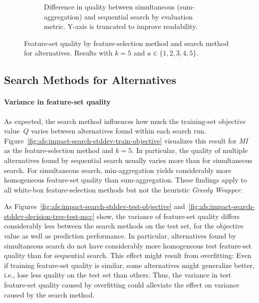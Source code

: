 \documentclass{article}
\theoremstyle{definition}
\begin{document}
\begin{figure}[t]
\begin{subfigure}[t]{0.48\textwidth}
		\caption{
			Difference in quality between simultaneous (sum-aggregation) and sequential search by evaluation metric.
			Y-axis is truncated to improve readability.
		}
		\label{fig:afs:impact-search-fs-method-metric-diff}
	\end{subfigure}
	\caption{
		Feature-set quality by feature-selection method and search method for alternatives.
		Results with $k=5$ and $a \in \{1,2,3,4,5\}$.
	}
	\label{fig:afs:impact-search-fs-method-quality}
\end{figure}

\subsection{Search Methods for Alternatives}
\label{sec:afs:evaluation:search-method}

\paragraph{Variance in feature-set quality}

As expected, the search method influences how much the training-set objective value~$Q$ varies between alternatives found within each search run.
Figure~\ref{fig:afs:impact-search-stddev-train-objective} visualizes this result for \emph{MI} as the feature-selection method and $k=5$.
In particular, the quality of multiple alternatives found by sequential search usually varies more than for simultaneous search.
For simultaneous search, min-aggregation yields considerably more homogeneous feature-set quality than sum-aggregation.
These findings apply to all white-box feature-selection methods but not the heuristic \emph{Greedy Wrapper}.

As Figures~\ref{fig:afs:impact-search-stddev-test-objective} and~\ref{fig:afs:impact-search-stddev-decision-tree-test-mcc} show, the variance of feature-set quality differs considerably less between the search methods on the test set, for the objective value as well as prediction performance.
In particular, alternatives found by simultaneous search do not have considerably more homogeneous test feature-set quality than for sequential search.
This effect might result from overfitting:
Even if training feature-set quality is similar, some alternatives might generalize better, i.e., lose less quality on the test set than others.
Thus, the variance in test feature-set quality caused by overfitting could alleviate the effect on variance caused by the search method.
\end{document}

